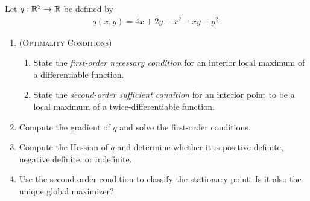 \documentclass[letterpaper,12pt]{article}
\begin{document}
Let $q:\mathbb{R}^2\to\mathbb{R}$ be defined by
\begin{align}
	q(x,y)=4x+2y-x^2-xy-y^2.
\end{align}

\begin{enumerate}
	\item(\textsc{Optimality Conditions})
		\begin{enumerate}
			\item
				State the \emph{first-order necessary condition} for an interior local maximum of a differentiable function.
			\item
				State the \emph{second-order sufficient condition} for an interior point to be a local maximum of a twice-differentiable function.
		\end{enumerate}
	\item
		Compute the gradient of $q$ and solve the first-order conditions.
	\item
		Compute the Hessian of $q$ and determine whether it is positive definite, negative definite, or indefinite.
	\item
		Use the second-order condition to classify the stationary point.
		Is it also the unique global maximizer?
\end{enumerate}
\end{document}
